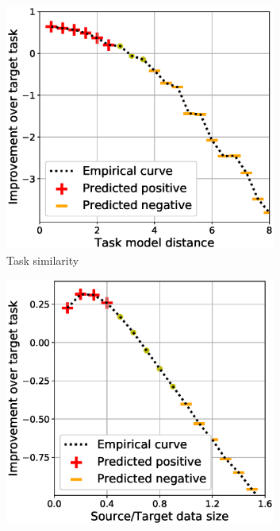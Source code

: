 \begin{figure}[!t]
	\begin{subfigure}[b]{0.32\textwidth}
		\centering
		\includegraphics[width=0.98\textwidth]{figures/model_shift_phase_transition.eps}
		\vspace{-0.075in}
		\caption{Task similarity}
		\label{fig_model_shift}
	\end{subfigure}\hfill
	\begin{subfigure}[b]{0.32\textwidth}
		\centering
		\includegraphics[width=0.98\textwidth]{figures/datapoints_phase_transition.eps}

\end{subfigure}
\end{figure}

